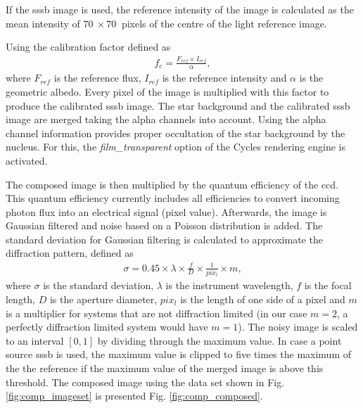 If the \gls{sssb} image is used, the reference intensity of the image is calculated as the mean intensity of $\SI{70}{}\times\SI{70}{}$ pixels of the centre of the light reference image.

Using the calibration factor defined as
\begin{align}
    f_c = \frac{F_{ref} \times I_{ref}}{\alpha}, \label{eq:comp_cal_fac}
\end{align}
where $F_{ref}$ is the reference flux, $I_{ref}$ is the reference intensity and $\alpha$ is the geometric albedo. Every pixel of the image is multiplied with this factor to produce the calibrated \gls{sssb} image. The star background and the calibrated \gls{sssb} image are merged taking the alpha channels into account. Using the alpha channel information provides proper occultation of the star background by the nucleus. For this, the \textit{film\_transparent} option of the Cycles rendering engine is activated.

The composed image is then multiplied by the quantum efficiency of the \gls{ccd}. This quantum efficiency currently includes all efficiencies to convert incoming photon flux into an electrical signal (pixel value). Afterwards, the image is Gaussian filtered and noise based on a Poisson distribution is added. The standard deviation for Gaussian filtering is calculated to approximate the diffraction pattern, defined as
\begin{align}
    \sigma = 0.45 \times \lambda \times \frac{f}{D}\times \frac{1}{pix_l} \times m, \label{eq:comp_sigma}
\end{align}
where $\sigma$ is the standard deviation, $\lambda$ is the instrument wavelength, $f$ is the focal length, $D$ is the aperture diameter, $pix_l$ is the length of one side of a pixel and $m$ is a multiplier for systems that are not diffraction limited (in our case $m = 2$, a perfectly diffraction limited system would have $m = 1$). The noisy image is scaled to an interval $[0,1]$ by dividing through the maximum value. In case a point source \gls{sssb} is used, the maximum value is clipped to five times the maximum of the the reference if the maximum value of the merged image is above this threshold. The composed image using the data set shown in Fig. \ref{fig:comp_imageset} is presented Fig. \ref{fig:comp_composed}.


